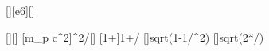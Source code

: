 [\mega\electronvolt][e6][\electronvolt]

[]{\EkX}[\volt]
[m_p c^2]{\ncmpX*\nccX^2/\nceX}[\electronvolt]
[1+]{1+\EkX/\EzX}
[]{sqrt(1-1/\gmX^2)}
[]{sqrt(2*\EkX/\EzX)}
